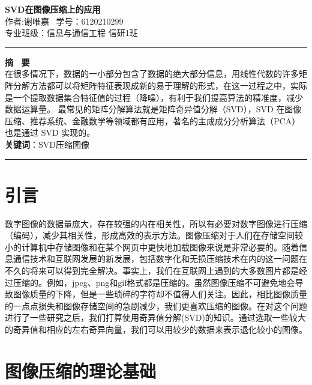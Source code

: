 \documentclass{hfutpaper}
\begin{document}
	\begin{center}
		\LARGE
		\textbf{SVD在图像压缩上的应用}\\
		\vspace{0.2em}
		\large
		作者:谢唯嘉 \ 学号：6120210299 \\ 
		专业班级：信息与通信工程 信研1班
	\end{center}
	\rule[0.1\baselineskip]{\textwidth}{0.5pt}
	\textbf{摘 \ 要}\\
	\large
	在很多情况下，数据的一小部分包含了数据的绝大部分信息，用线性代数的许多矩阵分解方法都可以将矩阵特征表现成新的易于理解的形式，在这一过程之中，实际是一个提取数据集合特征值的过程（降噪），有利于我们提高算法的精准度，减少数据运算量。 最常见的矩阵分解算法就是矩阵奇异值分解（SVD），SVD 在图像压缩、推荐系统、金融数学等领域都有应用，著名的主成成分分析算法（PCA）也是通过 SVD 实现的。
	\\
	\textbf{关键词}：SVD\quad 压缩\quad 图像\\
	\rule[0.1\baselineskip]{\textwidth}{0.5pt}
	\section{引言}
	数字图像的数据量庞大，存在较强的内在相关性，所以有必要对数字图像进行压缩（编码），减少其相关性，形成高效的表示方法。图像压缩对于人们在存储空间较小的计算机中存储图像和在某个网页中更快地加载图像来说是非常必要的\cite{ranade2007variation}。随着信息通信技术和互联网发展的新发展，包括数字化和无损压缩技术在内的这一问题在不久的将来可以得到完全解决\cite{nixon2019feature}。事实上，我们在互联网上遇到的大多数图片都是经过压缩的\cite{image}。例如，jpeg、png和gif格式都是压缩的。虽然图像压缩不可避免地会导致图像质量的下降，但是一些琐碎的字符却不值得人们关注。因此，相比图像质量的一点点损失和图像存储空间的急剧减少，我们更喜欢压缩的图像。在对这个问题进行了一些研究之后，我们打算使用奇异值分解(SVD)的知识。通过选取一些较大的奇异值和相应的左右奇异向量，我们可以用较少的数据来表示退化较小的图像。
	
	\section{图像压缩的理论基础}
\end{document}
